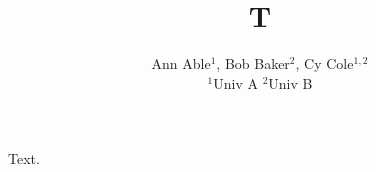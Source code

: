 \documentclass{article}
\begin{document}
\title{T}
\author{Ann Able$^1$, Bob Baker$^2$, Cy Cole$^{1,2}$ \\
$^1$Univ A $^2$Univ B}
\maketitle
Text.
\end{document}
